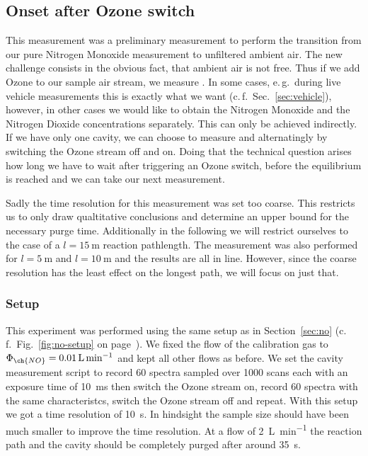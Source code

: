 \subsection{Onset after Ozone switch}
\label{sec:switch}

This measurement was a preliminary measurement to perform the 
transition from our pure Nitrogen Monoxide measurement to unfiltered
ambient air. The new challenge consists in the obvious fact, that
ambient air is not  free. Thus if we add Ozone to our sample
air stream, we measure . In some cases, e.\,g.\
during live vehicle measurements this is exactly what we want
(c.\,f.~Sec.~\ref{sec:vehicle}), however, in other cases we would like
to obtain the Nitrogen Monoxide and the Nitrogen Dioxide
concentrations separately. This can only be achieved indirectly. If
we have only one cavity, we can choose to measure \ch{NO2} and
 alternatingly by switching the Ozone stream off and
on. Doing that the technical question arises how long we have to wait
after triggering an Ozone switch, before the equilibrium is reached
and we can take our next measurement.

Sadly the time resolution for this measurement was set too
coarse. This restricts us to only draw qualtitative conclusions and
determine an upper bound for the necessary purge time. Additionally in
the following we will restrict ourselves to the case of a $l =
\SI{15}{\meter}$ reaction pathlength. The measurement was also
performed for $l = \SI{5}{\meter}$ and $l = \SI{10}{\meter}$ and the
results are all in line. However, since the coarse resolution has the
least effect on the longest path, we will focus on just that.

\subsubsection{Setup}
\label{sec:switch-setup}

This experiment was performed using the same setup as in
Section~\ref{sec:no} (c.\,f.\ Fig.~\ref{fig:no-setup} on
page~\pageref{fig:no-setup}). We fixed the flow of the 
calibration gas to $\Phi_{\ch{NO}} = \SI{0.01}{\liter\per\minute}$ and
kept all other flows as before. We set the cavity measurement script
to record 60 spectra sampled over 1000 scans each with an exposure
time of \SI{10}{\milli\second} then switch the Ozone stream on, record
60 spectra with the same characteristcs, switch the Ozone stream off
and repeat. With this setup we got a time resolution of
\SI{10}{\second}. In hindsight the sample size should have been much
smaller to improve the time resolution. At a flow of
\SI{2}{\liter\per\minute} the reaction path and the
cavity should be completely purged after around \SI{35}{\second}. 

